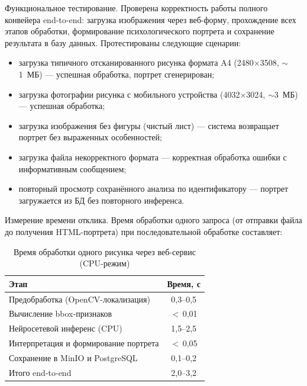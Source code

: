 Функциональное тестирование. Проверена корректность работы полного конвейера end-to-end: загрузка изображения через веб-форму, прохождение всех этапов обработки, формирование психологического портрета и сохранение результата в базу данных. Протестированы следующие сценарии:

\begin{itemize}
    \item загрузка типичного отсканированного рисунка формата A4 (2480$\times$3508, $\sim$1~МБ) --- успешная обработка, портрет сгенерирован;
    \item загрузка фотографии рисунка с мобильного устройства (4032$\times$3024, $\sim$3~МБ) --- успешная обработка;
    \item загрузка изображения без фигуры (чистый лист) --- система возвращает портрет без выраженных особенностей;
    \item загрузка файла некорректного формата --- корректная обработка ошибки с информативным сообщением;
    \item повторный просмотр сохранённого анализа по идентификатору --- портрет загружается из БД без повторного инференса.
\end{itemize}

Измерение времени отклика. Время обработки одного запроса (от отправки файла до получения HTML-портрета) при последовательной обработке составляет:

\begin{table}
    \caption{Время обработки одного рисунка через веб-сервис (CPU-режим)}
    \fontsize{12pt}{18pt}\selectfont
    \begin{tabular}{|l|c|}\hline
        \textbf{Этап} & \textbf{Время, с} \\ \hline
        Предобработка (OpenCV-локализация)    & 0,3--0,5 \\ \hline
        Вычисление bbox-признаков             & $<$\,0,01 \\ \hline
        Нейросетевой инференс (CPU)           & 1,5--2,5 \\ \hline
        Интерпретация и формирование портрета & $<$\,0,05 \\ \hline
        Сохранение в MinIO и PostgreSQL       & 0,1--0,2 \\ \hline
        Итого end-to-end                      & 2,0--3,2 \\ \hline
    \end{tabular}
    \label{tab:response-time}
\end{table}


